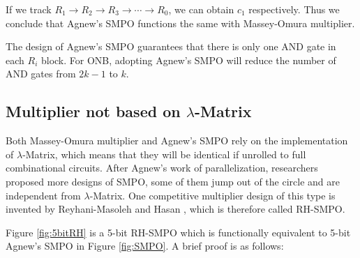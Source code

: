 \begin{Example}
If we track $R_1\to R_2\to R_3 \to \cdots \to R_0$, we can obtain $c_1$ respectively.
Thus we conclude that Agnew's SMPO functions the same with Massey-Omura multiplier.
\end{Example}

The design of Agnew's SMPO guarantees that there is only one AND gate in each $R_i$ block.
For ONB, adopting Agnew's SMPO will reduce the number of AND gates from $2k-1$ to $k$.

\subsection{Multiplier not based on $\lambda$-Matrix}
Both Massey-Omura multiplier and Agnew's SMPO rely on the implementation of $\lambda$-Matrix,
which means that they will be identical if unrolled to full combinational circuits. 
After Agnew's work of parallelization, researchers proposed more designs of SMPO, 
some of them jump out of the circle and are independent from $\lambda$-Matrix.
One competitive multiplier design of this type is invented by Reyhani-Masoleh and Hasan 
\cite{RHmulti}, which is therefore called RH-SMPO.

\begin{figure}[H]
\end{figure}

Figure \ref{fig:5bitRH} is a 5-bit RH-SMPO which is functionally equivalent to 5-bit Agnew's SMPO 
in Figure \ref{fig:SMPO}. A brief proof is as follows: 

